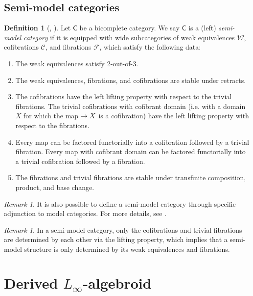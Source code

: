 \documentclass[12pt]{amsart}
\theoremstyle{definition}
\newtheorem{defn}[thm]{Definition}
\theoremstyle{remark}
\newtheorem{rem}[thm]{Remark}
\numberwithin{equation}{section}
\newcommand{\CC}{{\mathsf C}}
\newcommand{\1}{{\mathbb{1}}}
\begin{document}
\subsection{Semi-model categories}
\begin{defn}[\cite{Nui19}, \cite{WY18}]
    Let $\CC$ be a bicomplete category. We say $\CC$ is a (left) {\it semi-model category} if it is equipped with wide subcategories of weak equivalences $\mathcal{W}$, cofibrations $\mathcal{C}$, and fibrations $\mathcal{F}$, which satisfy the following data:
    \begin{enumerate}
        \item The weak equivalences satisfy 2-out-of-3.
        \item The weak equivalences, fibrations, and cofibrations are stable under retracts.
        \item The cofibrations have the left lifting property with respect to the trivial fibrations. The trivial cofibrations with cofibrant domain (i.e. with a domain $X$ for which the map $\empty \to X$ is a cofibration) have the left lifting property with respect to the fibrations.
        \item Every map can be factored functorially into a cofibration followed by a trivial fibration. Every map with cofibrant domain can be factored functorially into a trivial cofibration followed by a fibration.
        \item The fibrations and trivial fibrations are stable under transfinite composition, product, and base change.
    \end{enumerate}
\end{defn}
\begin{rem}
    It is also possible to define a semi-model category through specific adjunction to model categories. For more details, see \cite{WY18}.
\end{rem}
\begin{rem}
    In a semi-model category, only the cofibrations and trivial fibrations are determined by each other via the lifting property, which implies that a semi-model structure is only determined by its weak equivalences and fibrations.
\end{rem}
\section{Derived  $L_{\infty}$-algebroid}
\end{document}
